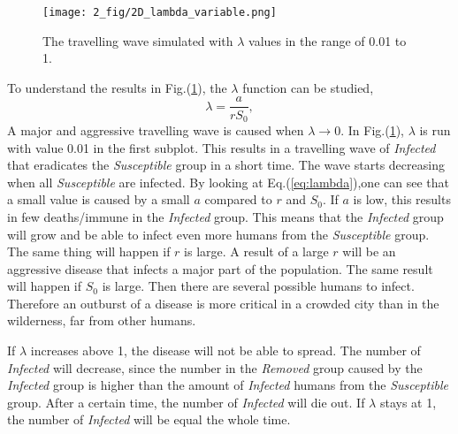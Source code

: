 \documentclass[%
twoside,                 %
final,                   %
chapterprefix=true,      %
open=right               %
10pt]{book}
\begin{document}
\begin{figure}[ht]
  \centerline{\texttt{[image: 2\_fig/2D\_lambda\_variable.png]}}
  \caption{
  \label{fig:change_lambda} The travelling wave simulated with $\lambda$ values in the range of 0.01 to 1.
  }
\end{figure}




\vspace{3mm}




\vspace{3mm}


To understand the results in Fig.(\ref{fig:change_lambda}), the $\lambda $ function can be studied,
\begin{equation} \label{eq:lambda}
 \lambda =\frac{a}{rS_0},
\end{equation}
A major and aggressive travelling wave is caused when $\lambda \rightarrow 0$. In Fig.(\ref{fig:change_lambda}), $\lambda$ is run with value 0.01 in the first subplot. This results in a travelling wave of \emph{Infected} that eradicates the \emph{Susceptible} group in a short time. The wave starts decreasing when all \emph{Susceptible} are infected. By looking at Eq.(\ref{eq:lambda}),one can see that a small value is caused by a small $a$ compared to $r$ and $S_0$. If $a$ is low, this results in few deaths/immune in the \emph{Infected} group. This means that the \emph{Infected} group will grow and be able to infect even more humans from the \emph{Susceptible} group. The same thing will happen if $r$ is large. A result of a large $r$ will be an aggressive disease that infects  a major part of the population. The same result will happen if $S_0$ is large. Then there are several possible humans to infect. Therefore an outburst of a disease is more critical in a crowded city than in the wilderness, far from other humans.


\vspace{3mm}




\vspace{3mm}


If $\lambda$ increases above 1, the disease will not be able to spread. The number of \emph{Infected} will decrease, since the number in the \emph{Removed} group caused by the \emph{Infected} group is higher than the amount of \emph{Infected} humans from the \emph{Susceptible} group. After a certain time, the number of \emph{Infected} will die out. If $\lambda$ stays at 1, the number of \emph{Infected} will be equal the whole time. 
\end{document}
